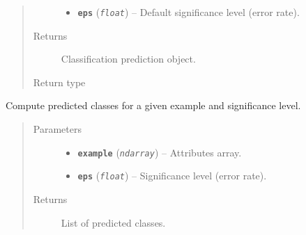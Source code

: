 \documentclass[letterpaper,10pt,english]{sphinxmanual}
\begin{document}
\begin{fulllineitems}
\begin{fulllineitems}
\begin{quote}
\begin{description}
\begin{itemize}
\item {} 
\textbf{\texttt{eps}} (\emph{\texttt{float}}) -- Default significance level (error rate).

\end{itemize}

\item[{Returns}] \leavevmode
Classification prediction object.

\item[{Return type}] \leavevmode
{\hyperref[cp.classification:cp.classification.PredictionClass]{}}

\end{description}\end{quote}

\end{fulllineitems}


\begin{fulllineitems}
\label{cp.classification:cp.classification.ConformalClassifier.__call__}
Compute predicted classes for a given example and significance level.
\begin{quote}\begin{description}
\item[{Parameters}] \leavevmode\begin{itemize}
\item {} 
\textbf{\texttt{example}} (\emph{\texttt{ndarray}}) -- Attributes array.

\item {} 
\textbf{\texttt{eps}} (\emph{\texttt{float}}) -- Significance level (error rate).

\end{itemize}

\item[{Returns}] \leavevmode
List of predicted classes.

\end{description}\end{quote}

\end{fulllineitems}


\end{fulllineitems}

\end{document}
